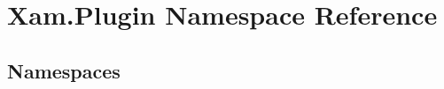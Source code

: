 \hypertarget{namespace_xam_1_1_plugin}{}\section{Xam.\+Plugin Namespace Reference}
\label{namespace_xam_1_1_plugin}
\subsection*{Namespaces}
\begin{DoxyCompactItemize}
\end{DoxyCompactItemize}
